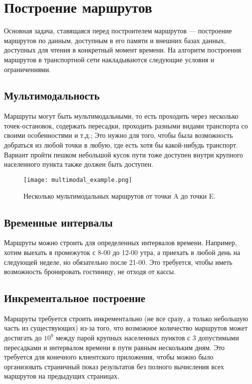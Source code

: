 \section{Построение маршрутов}
Основная задача, ставящаяся перед построителем маршрутов — построение маршрутов по данным, доступным в его памяти и внешних базах данных, доступных для чтения в конкретный момент времени. На алгоритм построения маршрутов в транспортной сети накладываются следующие условия и ограничениями.

\subsection{Мультимодальность}
Маршруты могут быть мультимодальными, то есть проходить через несколько точек-остановок, содержать пересадки, проходить разными видами транспорта со своими особенностями и т.д.; Это нужно для того, чтобы была возможность добраться из любой точки в любую, где есть хотя бы какой-нибудь транспорт. Вариант пройти пешком небольшой кусок пути тоже доступен внутри крупного населенного пункта также должен быть доступен.
\begin{figure}[!h]
    \centering
    \texttt{[image: multimodal\_example.png]}
    \caption{Несколько мультимодальных маршрутов от точки A до точки E.}\label{fig1}
\end{figure}

\subsection{Временные интервалы}
Маршруты можно строить для определенных интервалов времени. Например, хотим выехать в промежуток с 8-00 до 12-00 утра, а приехать в любой день на следующей неделе, но обязательно после 21-00. Это требуется, чтобы иметь возможность бронировать гостиницу, не отходя от кассы.

\subsection{Инкрементальное построение}
Маршруты требуется строить инкрементально (не все сразу, а только небольшую часть из существующих) из-за того, что возможное количество маршрутов может достигать до $10^9$ между парой крупных населенных пунктов с 3 допустимыми пересадками и интервалом времени в пути равным нескольким дням. Это требуется для конечного клиентского приложения, чтобы можно было организовать страничный показ результатов без полного вычисления всех маршрутов на предыдущих страницах.

